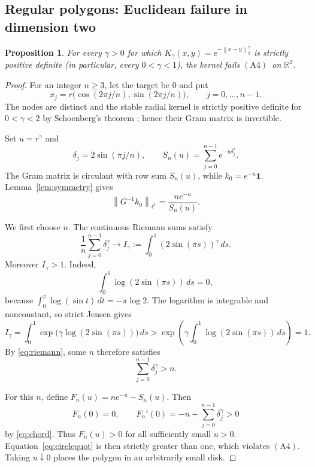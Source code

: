 \documentclass[11pt]{article}
\newtheorem{proposition}{Proposition}
\newcommand{\R}{\mathbb R}
\newcommand{\one}{\mathbf 1}
\newcommand{\norm}[1]{\left\lVert #1\right\rVert}
\newcommand{\Afour}{\ensuremath{\mathrm{(A4)}}}
\begin{document}
\subsection{Regular polygons: Euclidean failure in dimension two}

\begin{proposition}
\label{prop:circle}
For every $\gamma>0$ for which
$K_\gamma(x,y)=e^{-\norm{x-y}_2^\gamma}$ is strictly positive definite
(in particular, every $0<\gamma<1$), the kernel fails \Afour\ on $\R^2$.
\end{proposition}

\begin{proof}
For an integer $n\geq3$, let the target be $0$ and put
\[
 x_j=r\bigl(\cos(2\pi j/n),\sin(2\pi j/n)\bigr),
 \qquad j=0,\ldots,n-1.
\]
The nodes are distinct and the stable radial kernel is strictly positive
definite for $0<\gamma<2$ by Schoenberg's theorem
\cite{Schoenberg}; hence their Gram matrix is invertible.

Set $u=r^\gamma$ and
\[
 \delta_j=2\sin(\pi j/n),\qquad
 S_n(u)=\sum_{j=0}^{n-1}e^{-u\delta_j^\gamma}.
\]
The Gram matrix is circulant with row sum $S_n(u)$, while
$k_0=e^{-u}\one$.  Lemma~\ref{lem:symmetry} gives
\begin{equation}
 \norm{G^{-1}k_0}_{\ell^1}
   =\frac{ne^{-u}}{S_n(u)}.
 \label{eq:circlequot}
\end{equation}

We first choose $n$.  The continuous Riemann sums satisfy
\begin{equation}
 \frac1n\sum_{j=0}^{n-1}\delta_j^\gamma
 \longrightarrow
 I_\gamma:=\int_0^1(2\sin(\pi s))^\gamma\,ds.
 \label{eq:riemann}
\end{equation}
Moreover $I_\gamma>1$.  Indeed,
\[
 \int_0^1\log(2\sin(\pi s))\,ds=0,
\]
because $\int_0^\pi\log(\sin t)\,dt=-\pi\log2$.  The logarithm is
integrable and nonconstant, so strict Jensen gives
\[
 I_\gamma
 =\int_0^1\exp\!\bigl(\gamma\log(2\sin(\pi s))\bigr)\,ds
 >
 \exp\!\left(\gamma\int_0^1\log(2\sin(\pi s))\,ds\right)=1.
\]
By \eqref{eq:riemann}, some $n$ therefore satisfies
\begin{equation}
  \sum_{j=0}^{n-1}\delta_j^\gamma>n.
  \label{eq:chord}
\end{equation}

For this $n$, define $F_n(u)=ne^{-u}-S_n(u)$.  Then
\[
 F_n(0)=0,\qquad
 F_n'(0)=-n+\sum_{j=0}^{n-1}\delta_j^\gamma>0
\]
by \eqref{eq:chord}.  Thus $F_n(u)>0$ for all sufficiently small
$u>0$.  Equation~\eqref{eq:circlequot} is then strictly greater than one,
which violates \Afour.  Taking $u\downarrow0$ places the polygon in an
arbitrarily small disk.
\end{proof}
\end{document}
